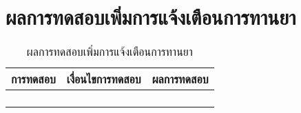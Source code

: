 \section{ผลการทดสอบเพิ่มการแจ้งเตือนการทานยา}
\begin{table}[H]
	\caption{ผลการทดสอบเพิ่มการแจ้งเตือนการทานยา}
    \centering	
	\label{tab:test18}
    \begin{tabular}{ | p{4cm} | p{4cm} | p{4cm} |  }
		\hline
	\multicolumn{1}{|c|}{การทดสอบ} & \multicolumn{1}{c|}{เงื่อนไขการทดสอบ} & \multicolumn{1}{c|}{ผลการทดสอบ}   \\ \hline
	\setstretch{1.0}{ทดสอบเพิ่มการแจ้งเตือนการทานยา}
	& \setstretch{1.0}{ผู้ใช้เลือกประเภท กรอกชื่อยา กรอกจำนวน เลือกช่วงเวลา และกดบันทึกข้อมูลยา}
	& \setstretch{1.0}{ระบบจะบันทึกข้อมูล และแสดงข้อความ  บันทึกข้อมูลยาเรียบร้อยแล้ว } \\ \cline{2-3} 
	& \setstretch{1.0}{ผู้ใช้ไม่กรอกข้อมูล และกดบันทึกข้อมูลยา}
	& \setstretch{1.0}{ระบบจะแสดงข้อความ  กรอกข้อมูลให้ถูกต้อง  } \\ \cline{2-3} 
	& \setstretch{1.0}{ผู้ใช้เลือกตั้งเวลาแจ้งเตือน}
	& \setstretch{1.0}{ระบบจะแสดงรูปแบบเวลาแบบ 24 Hrs } \\ \cline{2-3} 
	& \setstretch{1.0}{ผู้ใช้เลือกประเภท}
	& \setstretch{1.0}{ระบบจะให้เลือกได้ 2 ประเภท ได้แก่ สำหรับรับประทาน และ สำหรับฉีด } \\ \hline
    \end{tabular}
\end{table}